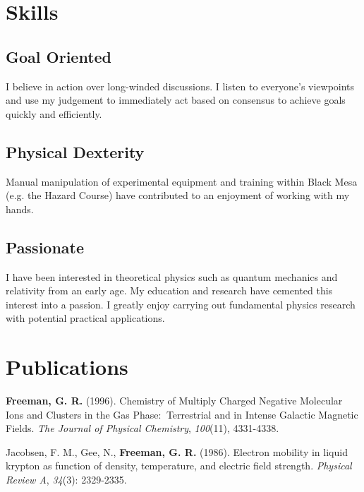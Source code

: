 \documentclass[
	10pt, %
]{FreemanCV}
\begin{document}
\begin{paracol}{2}
\section{Skills}

\subsection{Goal Oriented}

I believe in action over long-winded discussions. I listen to everyone's viewpoints and use my judgement to immediately act based on consensus to achieve goals quickly and efficiently.

\subsection{Physical Dexterity}

Manual manipulation of experimental equipment and training within Black Mesa (e.g. the Hazard Course) have contributed to an enjoyment of working with my hands.

\subsection{Passionate}

I have been interested in theoretical physics such as quantum mechanics and relativity from an early age. My education and research have cemented this interest into a passion. I greatly enjoy carrying out fundamental physics research with potential practical applications.


\section{Publications}


\textbf{Freeman, G. R.} (1996). Chemistry of Multiply Charged Negative Molecular Ions and Clusters in the Gas Phase:  Terrestrial and in Intense Galactic Magnetic Fields. \textit{The Journal of Physical Chemistry}, \textit{100}(11), 4331-4338.

\medskip %

Jacobsen, F. M., Gee, N., \textbf{Freeman, G. R.} (1986). Electron mobility in liquid krypton as function of density, temperature, and electric field strength. \textit{Physical Review A}, \textit{34}(3): 2329-2335.


\end{paracol}
\end{document}
